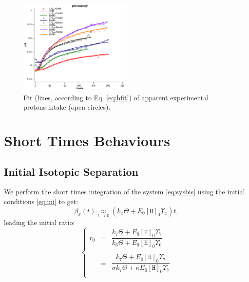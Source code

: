 \documentclass[aps,onecolumn,11pt]{revtex4}
\newcommand{\mychem}[1]{\mathtt{#1}}
\newcommand{\myconc}[1]{\left\lbrack{#1}\right\rbrack}
\newcommand{\spproton}{\mychem{H}}
\newcommand{\proton}{\myconc{\spproton}}
\begin{document}
\begin{figure}[!ht]
\begin{center}
\includegraphics[width=0.5\textwidth]{protons.pdf}
\end{center}
\caption{\label{fig:protons} Fit (lines, according to Eq. \eqref{eq:hfit}) of apparent experimental protons intake (open circles).}
\end{figure}


\section{Short Times Behaviours}

\subsection{Initial Isotopic Separation}
We perform the short times integration of the system \eqref{eq:sysbis} using the initial
conditions \eqref{eq:ini} to get:
\begin{equation}
\beta_x(t) \underset{t\to0}{\approx} \left(k_x \Theta + E_0 \proton_0 \Upsilon_x\right) t,
\end{equation}
leading the initial ratio:
\begin{equation}
\label{eq:r0}
\left\lbrace
\begin{array}{rcl}
r_0 & = & \dfrac{k_7\Theta+E_0 \proton_0 \Upsilon_7}{k_6\Theta+E_0 \proton_0 \Upsilon_6}\\
	\\
    & = & \dfrac{k_7\Theta+E_0 \proton_0 \Upsilon_7}{ \sigma k_7\Theta+ \kappa E_0 \proton_0 \Upsilon_7}\\
\end{array}
\right.
\end{equation}
\end{document}
